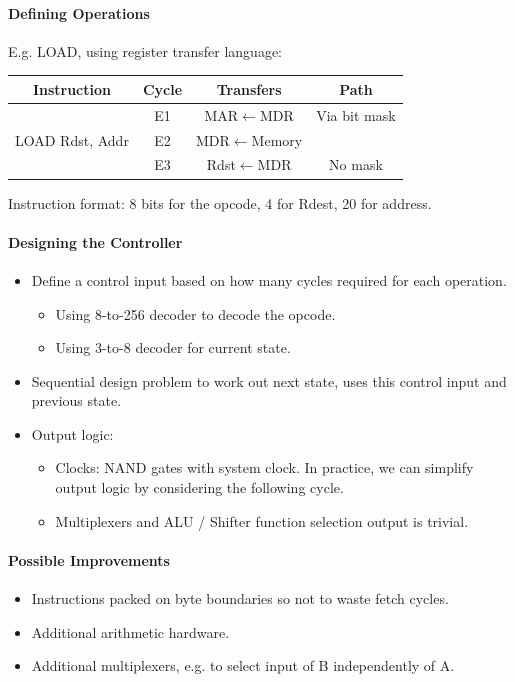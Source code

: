 \documentclass[twocolumn,english]{article}
\providecommand{\tabularnewline}{\\}
\begin{document}
\paragraph{Defining Operations}

E.g. LOAD, using register transfer language:

\noindent 
\begin{table}[H]
\noindent \centering{}%
\begin{tabular}{cccc}
\toprule 
{\footnotesize{}Instruction} & {\footnotesize{}Cycle} & {\footnotesize{}Transfers} & {\footnotesize{}Path}\tabularnewline
\midrule 
\multirow{3}{*}{{\footnotesize{}LOAD Rdst, Addr}} & {\footnotesize{}E1} & {\footnotesize{}MAR$\leftarrow$MDR} & {\footnotesize{}Via bit mask}\tabularnewline
 & {\footnotesize{}E2} & {\footnotesize{}MDR$\leftarrow$Memory} & \tabularnewline
 & {\footnotesize{}E3} & {\footnotesize{}Rdst$\leftarrow$MDR} & {\footnotesize{}No mask}\tabularnewline
\bottomrule
\end{tabular}
\end{table}


Instruction format: 8 bits for the opcode, 4 for Rdest, 20 for address.


\paragraph{Designing the Controller}
\begin{itemize}
\item Define a control input based on how many cycles required for each
operation.

\begin{itemize}
\item Using 8-to-256 decoder to decode the opcode.
\item Using 3-to-8 decoder for current state.
\end{itemize}
\item Sequential design problem to work out next state, uses this control
input and previous state.
\item Output logic:

\begin{itemize}
\item Clocks: NAND gates with system clock. In practice, we can simplify
output logic by considering the following cycle.
\item Multiplexers and ALU / Shifter function selection output is trivial.
\end{itemize}
\end{itemize}

\paragraph{Possible Improvements}
\begin{itemize}
\item Instructions packed on byte boundaries so not to waste fetch cycles.
\item Additional arithmetic hardware.
\item Additional multiplexers, e.g. to select input of B independently of
A.\end{itemize}
\end{document}
